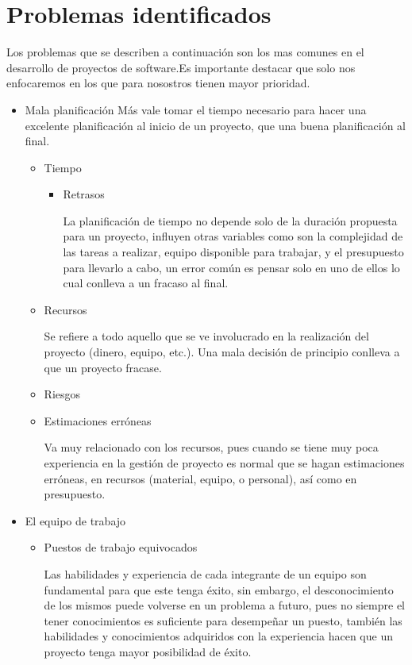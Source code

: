 \section{Problemas identificados } 
Los problemas que se describen a continuación son los mas comunes en el desarrollo de proyectos de software.Es importante destacar que solo nos enfocaremos en los que para nosostros tienen mayor prioridad. 
\begin{itemize}
\item Mala planificación
Más vale tomar el tiempo necesario para hacer una excelente planificación al inicio de un proyecto, que una buena planificación al final. 
\begin{itemize}
\item Tiempo 
\begin{itemize}
\item Retrasos  

La planificación de tiempo no depende solo de la duración propuesta para un proyecto, influyen otras variables como son la complejidad de las tareas a realizar, equipo disponible para trabajar, y el presupuesto para llevarlo a cabo, un error común es pensar solo en uno de ellos lo cual conlleva a un fracaso al final. 
\end{itemize}

\item Recursos  

Se refiere a todo aquello que se ve involucrado en la realización del proyecto (dinero, equipo, etc.). Una mala decisión de principio conlleva a que un proyecto fracase. 
\item Riesgos 

\item Estimaciones erróneas 

Va muy relacionado con los recursos, pues cuando se tiene muy poca experiencia en la gestión de proyecto es normal que se hagan estimaciones erróneas, en recursos (material, equipo, o personal), así como en presupuesto. 
\end{itemize}
\item El equipo de trabajo 
\begin{itemize}
\item Puestos de trabajo equivocados 

Las habilidades y experiencia de cada integrante de un equipo son fundamental para que este tenga éxito, sin embargo, el desconocimiento de los mismos puede volverse en un problema a futuro, pues no siempre el tener conocimientos es suficiente para desempeñar un puesto, también las habilidades y conocimientos adquiridos con la experiencia hacen que un proyecto tenga mayor posibilidad de éxito. 


\end{itemize}
\end{itemize}

